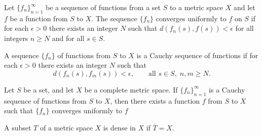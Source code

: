 \documentclass[nobib,notoc]{tufte-handout}
\begin{document}
\begin{defi}
	Let \(\{f_n\}_{n=1}^{\infty}\) be a sequence of functions from a set \(S\) to a metric space \(X\) and let \(f\) be a function from \(S\) to \(X\). The sequence \(\{f_n\}\) converges uniformly to \(f\) on \(S\) if for each \(\epsilon>0\) there exists an integer \(N\) such that \(d(f_n(s),f(s))<\epsilon\) for all integers \(n\geq N\) and for all \(s\in S\).
\end{defi}
\begin{defi}
	A sequence \(\{f_n\}\) of functions from \(S\) to \(X\) is a Cauchy sequence of functions if for each \(\epsilon>0\) there exists an integer \(N\) such that
	\begin{equation*}
		d(f_n(s),f_m(s))<\epsilon,\qquad\text{all }s\in S,\; n,m\geq N.
	\end{equation*}
\end{defi}
\begin{thm}
	Let \(S\) be a set, and let \(X\) be a complete metric space. If \(\{f_n\}_{n=1}^{\infty}\) is a Cauchy sequence of functions from \(S\) to \(X\), then there exists a function \(f\) from \(S\) to \(X\) such that \(\{f_n\}\) converges uniformly to \(f\)
	\begin{IEEEproof}
	\end{IEEEproof}
\end{thm}
\begin{defi}
	A subset \(T\) of a metric space \(X\) is dense in \(X\) if \(\overline{T}=X\).
\end{defi}
\end{document}
